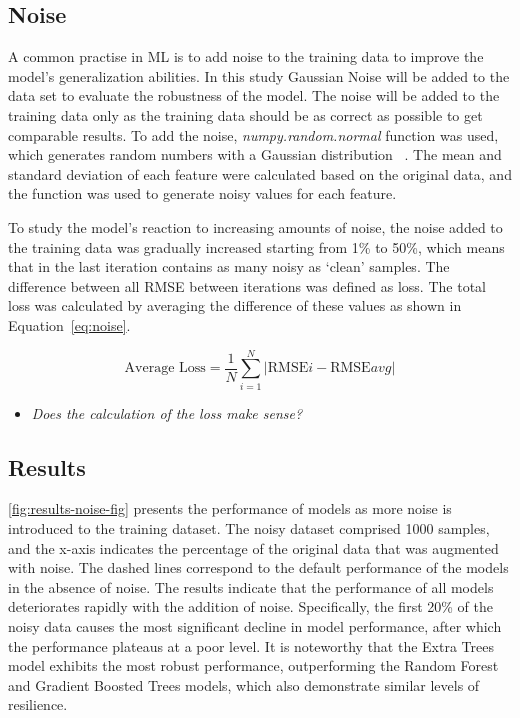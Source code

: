 \subsection{Noise}\label{subsec:noise}
A common practise in \ac{ML} is to add noise to the training data to improve
the model's generalization abilities.
In this study Gaussian Noise will be added to the data set to evaluate the robustness
of the model.
The noise will be added to the training data only as the training data should be as correct as possible to get
comparable results.
To add the noise, \textit{numpy.random.normal} function was used, which generates random numbers with a Gaussian
distribution
~\cite{harris2020array}.
The mean and standard deviation of each feature were calculated based on the original data, and the function was
used to generate noisy values for each feature.

To study the model's reaction to increasing amounts of noise, the noise added
to the training data was gradually increased starting from 1\% to 50\%, which means that in the
last iteration contains as many noisy as `clean' samples.
The difference between all \ac{RMSE} between iterations was defined as loss.
The total loss was calculated by averaging the difference of these values as shown in Equation~\ref{eq:noise}.

\begin{tcolorbox}[arc=0pt,boxrule=0.5pt]
    \begin{equation}
        \text{Average Loss} = \frac{1}{N} \sum_{i=1}^{N} |\text{RMSE}i -
        \text{RMSE}{avg}|\label
        {eq:noise}
    \end{equation}
\end{tcolorbox}

\begin{itemize}
    \item \textit{Does the calculation of the loss make sense?}
\end{itemize}

\subsection{Results}\label{subsec:results-robustness}
\cref{fig:results-noise-fig} presents the performance of models as more noise is introduced to the training
dataset.
The noisy dataset comprised 1000 samples, and the x-axis indicates the percentage of the original data that
was augmented with noise.
The dashed lines correspond to the default performance of the models in the absence of noise.
The results indicate that the performance of all models deteriorates rapidly with the addition of noise.
Specifically, the first 20\% of the noisy data causes the most significant decline in model performance, after which the
performance plateaus at a poor level.
It is noteworthy that the Extra Trees model exhibits the most robust performance, outperforming the Random Forest
and Gradient Boosted Trees models, which also demonstrate similar levels of resilience.

